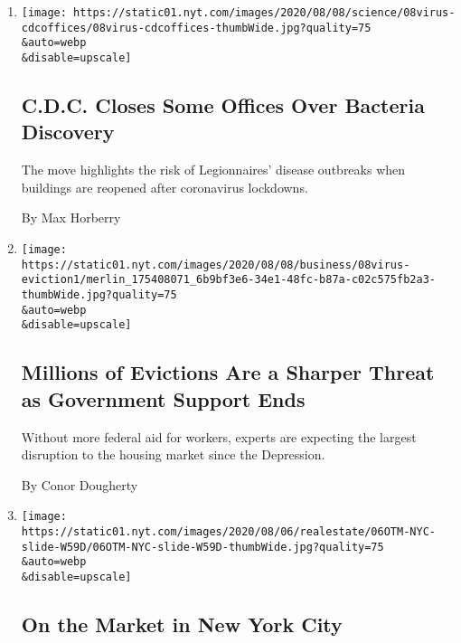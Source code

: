 \begin{enumerate}
\def\labelenumi{\arabic{enumi}.}
\item
  \href{/2020/08/08/health/cdc-legionnaires-coronavirus.html}{}

  \texttt{[image: https://static01.nyt.com/images/2020/08/08/science/08virus-cdcoffices/08virus-cdcoffices-thumbWide.jpg?quality=75\\\&auto=webp\\\&disable=upscale]}

  \hypertarget{cdc-closes-some-offices-over-bacteria-discovery}{%
  \subsection{C.D.C. Closes Some Offices Over Bacteria
  Discovery}\label{cdc-closes-some-offices-over-bacteria-discovery}}

  The move highlights the risk of Legionnaires' disease outbreaks when
  buildings are reopened after coronavirus lockdowns.

  By Max Horberry
\item
  \href{/2020/08/07/business/economy/housing-economy-eviction-renters.html}{}

  \texttt{[image: https://static01.nyt.com/images/2020/08/08/business/08virus-eviction1/merlin\_175408071\_6b9bf3e6-34e1-48fc-b87a-c02c575fb2a3-thumbWide.jpg?quality=75\\\&auto=webp\\\&disable=upscale]}

  \hypertarget{millions-of-evictions-are-a-sharper-threat-as-government-support-ends}{%
  \subsection{Millions of Evictions Are a Sharper Threat as Government
  Support
  Ends}\label{millions-of-evictions-are-a-sharper-threat-as-government-support-ends}}

  Without more federal aid for workers, experts are expecting the
  largest disruption to the housing market since the Depression.

  By Conor Dougherty
\item
  \href{/slideshow/2020/08/06/realestate/on-the-market-in-new-york-city.html}{}

  \texttt{[image: https://static01.nyt.com/images/2020/08/06/realestate/06OTM-NYC-slide-W59D/06OTM-NYC-slide-W59D-thumbWide.jpg?quality=75\\\&auto=webp\\\&disable=upscale]}

  \hypertarget{on-the-market-in-new-york-city}{%
  \subsection{On the Market in New York
  City}\label{on-the-market-in-new-york-city}}


\end{enumerate}

